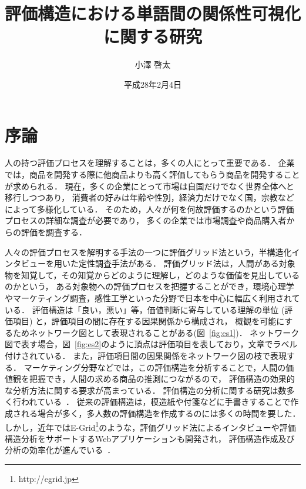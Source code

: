 \documentclass[syuuron]{kuee}
\title{評価構造における単語間の関係性可視化に関する研究}
\author{小澤 啓太}
\date{平成28年2月4日}
\begin{document}
\maketitle
\tableofcontents


\chapter{序論}
	人の持つ評価プロセスを理解することは，多くの人にとって重要である．
	企業では，商品を開発する際に他商品よりも高く評価してもらう商品を開発することが求められる．
	現在，多くの企業にとって市場は自国だけでなく世界全体へと移行しつつあり，
	消費者の好みは年齢や性別，経済力だけでなく国，宗教などによって多様化している．
	そのため，人々が何を何故評価するのかという評価プロセスの詳細な調査が必要であり，
	多くの企業では市場調査や商品購入者からの評価を調査する．
	
	人々の評価プロセスを解明する手法の一つに評価グリッド法という，半構造化インタビューを用いた定性調査手法がある．
	評価グリッド法は，人間がある対象物を知覚して，その知覚からどのように理解し，どのような価値を見出しているのかという，
	ある対象物への評価プロセスを把握することができ，環境心理学やマーケティング調査，感性工学といった分野で日本を中心に幅広く利用されている\cite{sen1}．
	評価構造は「良い，悪い」等，価値判断に寄与している理解の単位 (評価項目) と，評価項目の間に存在する因果関係から構成され，
	概観を可能にするためネットワーク図として表現されることがある(図~\ref{fig:es1})．
	ネットワーク図で表す場合，図~\ref{fig:es2}のように頂点は評価項目を表しており，文章でラベル付けされている．
	また，評価項目間の因果関係をネットワーク図の枝で表現する．
	マーケティング分野などでは，この評価構造を分析することで，人間の価値観を把握でき，人間の求める商品の推測につながるので，
	評価構造の効果的な分析方法に関する要求が高まっている\cite{egm6, egm7}．
	評価構造の分析に関する研究は数多く行われている~\cite{egm8, egm9}．
	従来の評価構造は，模造紙や付箋などに手書きすることで作成される場合が多く，多人数の評価構造を作成するのには多くの時間を要した．
	しかし，近年ではE-Grid\footnote{http://egrid.jp}のような，評価グリッド法によるインタビューや評価構造分析をサポートするWebアプリケーションも開発され，
	評価構造作成及び分析の効率化が進んでいる~\cite{egm6, egm10}．
	
\end{document}
